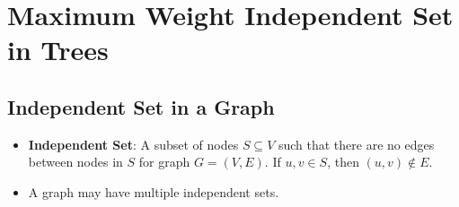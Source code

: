 
\section{Maximum Weight Independent Set in Trees}

\subsection{Independent Set in a Graph}
\begin{itemize}
    \item \textbf{Independent Set}: A subset of nodes $S \subseteq V$ such that there are no edges between nodes in $S$ for graph $G = (V, E)$. If $u, v \in S$, then $(u, v) \notin E$.
    \item A graph may have multiple independent sets.
\end{itemize}

